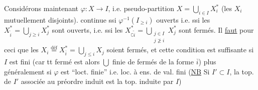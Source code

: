Considérons maintenant $\varphi:X\longrightarrow I$, i.e.  pseudo-partition  $X=\bigcup_{i\in I}X_i^*$
(les $X_i$ mutuellement disjoints).  continue ssi
$\varphi^{-1}(I_{\geq i})$ ouverts
 i.e. ssi les $X_{\widetilde i}^*=\bigcup_{j\geq i}X_j^*$ sont ouverts, i.e. ssi les
$X_{\complement\widetilde i}^*=\bigcup_{\substack{j\in I\\j\not\geq i}}X_j^*$
sont fermés. Il \uline{faut} pour ceci que les
$X_i\overset{\mathrm{déf}}=X_{\overline i}^*=\bigcup_{j\leq i}X_j$
soient fermés, et cette condition est suffisante
si $I$ est fini (car tt fermé  est alors $\bigcup$ finie de fermés de la forme $\overline i$)
plus généralement si $\varphi$ est ``loct. finie'' i.e. loc. à ens. de val. fini
(\uline{NB} Si $I'\subset I$, la top. de $I'$ associée au préordre induit est la top. induite
par $I$)


